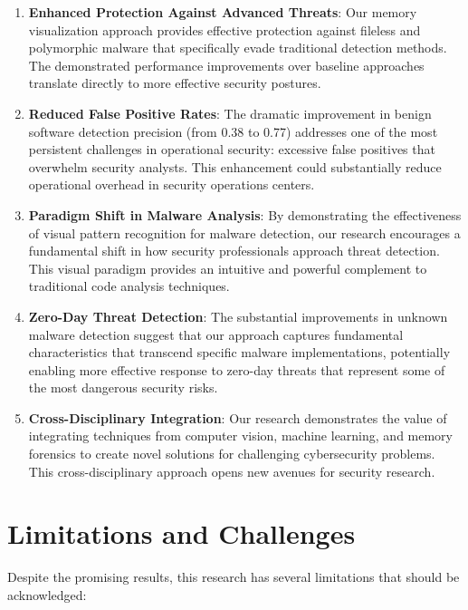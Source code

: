 \begin{enumerate}
    \item \textbf{Enhanced Protection Against Advanced Threats}: Our memory visualization approach provides effective protection against fileless and polymorphic malware that specifically evade traditional detection methods. The demonstrated performance improvements over baseline approaches translate directly to more effective security postures.
    
    \item \textbf{Reduced False Positive Rates}: The dramatic improvement in benign software detection precision (from 0.38 to 0.77) addresses one of the most persistent challenges in operational security: excessive false positives that overwhelm security analysts. This enhancement could substantially reduce operational overhead in security operations centers.
    
    \item \textbf{Paradigm Shift in Malware Analysis}: By demonstrating the effectiveness of visual pattern recognition for malware detection, our research encourages a fundamental shift in how security professionals approach threat detection. This visual paradigm provides an intuitive and powerful complement to traditional code analysis techniques.
    
    \item \textbf{Zero-Day Threat Detection}: The substantial improvements in unknown malware detection suggest that our approach captures fundamental characteristics that transcend specific malware implementations, potentially enabling more effective response to zero-day threats that represent some of the most dangerous security risks.
    
    \item \textbf{Cross-Disciplinary Integration}: Our research demonstrates the value of integrating techniques from computer vision, machine learning, and memory forensics to create novel solutions for challenging cybersecurity problems. This cross-disciplinary approach opens new avenues for security research.
\end{enumerate}

\section{Limitations and Challenges}

Despite the promising results, this research has several limitations that should be acknowledged:

